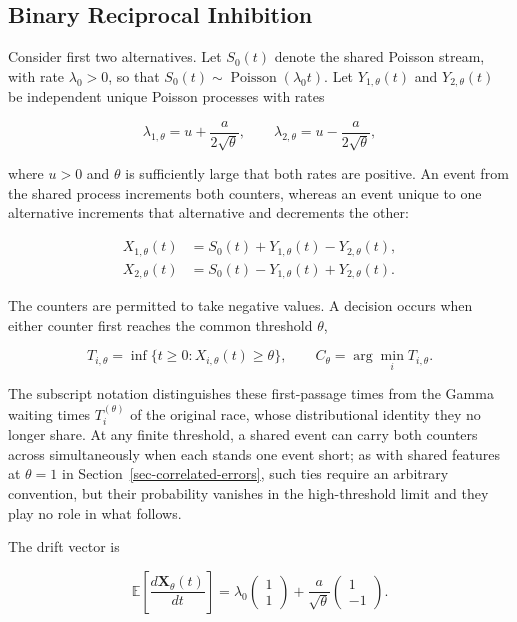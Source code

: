 \documentclass[
  man,
  floatsintext,
  longtable,
  a4paper,
  nolmodern,
  notxfonts,
  notimes,
  colorlinks=true,linkcolor=blue,citecolor=blue,urlcolor=blue]{apa7}
\begin{document}
\subsection{Binary Reciprocal
Inhibition}\label{binary-reciprocal-inhibition}

Consider first two alternatives. Let \(S_0(t)\) denote the shared
Poisson stream, with rate \(\lambda_0>0\), so that
\(S_0(t)\sim\operatorname{Poisson}(\lambda_0 t)\). Let
\(Y_{1,\theta}(t)\) and \(Y_{2,\theta}(t)\) be independent unique
Poisson processes with rates

\[
\lambda_{1,\theta}
=
u+\frac{a}{2\sqrt{\theta}},
\qquad
\lambda_{2,\theta}
=
u-\frac{a}{2\sqrt{\theta}},
\]

where \(u>0\) and \(\theta\) is sufficiently large that both rates are
positive. An event from the shared process increments both counters,
whereas an event unique to one alternative increments that alternative
and decrements the other:

\[
\begin{aligned}
X_{1,\theta}(t)
&=
S_0(t)+Y_{1,\theta}(t)-Y_{2,\theta}(t),\\
X_{2,\theta}(t)
&=
S_0(t)-Y_{1,\theta}(t)+Y_{2,\theta}(t).
\end{aligned}
\]

The counters are permitted to take negative values. A decision occurs
when either counter first reaches the common threshold \(\theta\),

\[
T_{i,\theta}
=
\inf\{t\geq 0:X_{i,\theta}(t)\geq\theta\},
\qquad
C_\theta
=
\arg\min_i T_{i,\theta}.
\]

The subscript notation distinguishes these first-passage times from the
Gamma waiting times \(T_i^{(\theta)}\) of the original race, whose
distributional identity they no longer share. At any finite threshold, a
shared event can carry both counters across simultaneously when each
stands one event short; as with shared features at \(\theta=1\) in
Section~\ref{sec-correlated-errors}, such ties require an arbitrary
convention, but their probability vanishes in the high-threshold limit
and they play no role in what follows.

The drift vector is

\[
\mathbb{E}
\left[
\frac{d\mathbf X_\theta(t)}{dt}
\right]
=
\lambda_0
\begin{pmatrix}
1\\
1
\end{pmatrix}
+
\frac{a}{\sqrt{\theta}}
\begin{pmatrix}
1\\
-1
\end{pmatrix}.
\]
\end{document}
